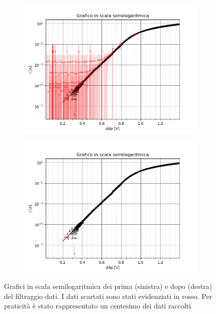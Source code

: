 \documentclass{article}[a4paper, oneside, 11pt]
\begin{document}
\begin{figure}[!htbp]%
\centering
\begin{subfigure}{.5\textwidth}
	\centering 
 		\includegraphics[scale=0.5]{./nofilter.png}
	\label{fig: nofilter}
\end{subfigure}%
\begin{subfigure}{.5\textwidth}
	\centering 
 		\includegraphics[scale=0.5]{./filtered.png}
	\label{fig: filtered}
\end{subfigure}
	\caption{Grafici in scala semilogaritmica dei prima (sinistra) e dopo 
(destra) del filtraggio dati. I dati scartati sono stati evidenziati in rosso. 
Per praticità è stato rappresentato un centesimo dei dati raccolti}
\end{figure}
\end{document}

